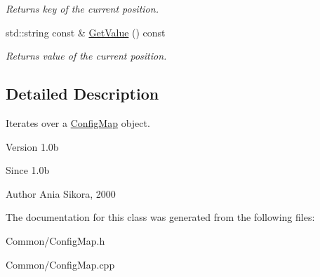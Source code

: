 \begin{DoxyCompactItemize}
\begin{DoxyCompactList}\small\item\em Returns key of the current position. \end{DoxyCompactList}\item 
\hypertarget{class_common_1_1_config_map_1_1_iterator_aff11c0a07605df50c48e300de7fd05e6}{std\-::string const \& \hyperlink{class_common_1_1_config_map_1_1_iterator_aff11c0a07605df50c48e300de7fd05e6}{Get\-Value} () const }\label{class_common_1_1_config_map_1_1_iterator_aff11c0a07605df50c48e300de7fd05e6}

\begin{DoxyCompactList}\small\item\em Returns value of the current position. \end{DoxyCompactList}\end{DoxyCompactItemize}


\subsection{Detailed Description}
Iterates over a \hyperlink{class_common_1_1_config_map}{Config\-Map} object. 

\begin{DoxyVersion}{Version}
1.\-0b 
\end{DoxyVersion}
\begin{DoxySince}{Since}
1.\-0b 
\end{DoxySince}
\begin{DoxyAuthor}{Author}
Ania Sikora, 2000 
\end{DoxyAuthor}


The documentation for this class was generated from the following files\-:\begin{DoxyCompactItemize}
\item 
Common/Config\-Map.\-h\item 
Common/Config\-Map.\-cpp\end{DoxyCompactItemize}
